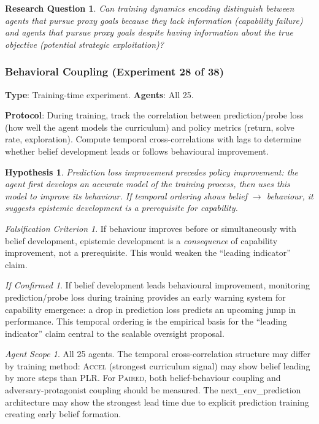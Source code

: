 \documentclass[11pt,a4paper]{article}
\newtheorem{hypothesis}{Hypothesis}[subsection]
\newtheorem{researchq}{Research Question}[subsection]
\theoremstyle{remark}
\newtheorem*{falsification}{Falsification Criterion}
\newtheorem*{implication}{If Confirmed}
\newtheorem*{agentscope}{Agent Scope}
\newcommand{\paired}{\textsc{Paired}}
\newcommand{\accel}{\textsc{Accel}}
\newcommand{\plr}{\textsc{PLR}}
\begin{document}
\begin{researchq}
Can training dynamics encoding distinguish between agents that pursue proxy goals because they lack information (capability failure) and agents that pursue proxy goals despite having information about the true objective (potential strategic exploitation)?
\end{researchq}

\subsubsection{Behavioral Coupling (Experiment 28 of 38)}
\label{exp:behavioral_coupling}

\textbf{Type}: Training-time experiment. \textbf{Agents}: All 25.

\textbf{Protocol}: During training, track the correlation between prediction/probe loss (how well the agent models the curriculum) and policy metrics (return, solve rate, exploration). Compute temporal cross-correlations with lags to determine whether belief development leads or follows behavioural improvement.

\begin{hypothesis}
Prediction loss improvement precedes policy improvement: the agent first develops an accurate model of the training process, then uses this model to improve its behaviour. If temporal ordering shows belief $\to$ behaviour, it suggests epistemic development is a prerequisite for capability.
\end{hypothesis}

\begin{falsification}
If behaviour improves before or simultaneously with belief development, epistemic development is a \textit{consequence} of capability improvement, not a prerequisite. This would weaken the ``leading indicator'' claim.
\end{falsification}

\begin{implication}
If belief development leads behavioural improvement, monitoring prediction/probe loss during training provides an early warning system for capability emergence: a drop in prediction loss predicts an upcoming jump in performance. This temporal ordering is the empirical basis for the ``leading indicator'' claim central to the scalable oversight proposal.
\end{implication}

\begin{agentscope}
All 25 agents. The temporal cross-correlation structure may differ by training method: \accel{} (strongest curriculum signal) may show belief leading by more steps than \plr{}. For \paired{}, both belief-behaviour coupling and adversary-protagonist coupling should be measured. The next\_env\_prediction architecture may show the strongest lead time due to explicit prediction training creating early belief formation.
\end{agentscope}
\end{document}
